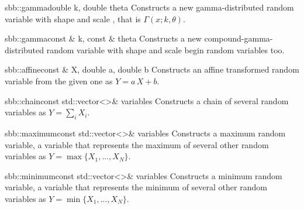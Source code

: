 \documentclass[a4paper, 10pt]{paper}
\begin{document}
\begin{deffunc}{sbb::gamma}{}{double k, double theta}
Constructs a new gamma-distributed random variable with shape  and 
scale  , that is $\Gamma(x; k, \theta)$.
\end{deffunc}

\begin{deffunc*}{sbb::gamma}{}{const \& k, const \& theta}
Constructs a new compound-gamma-distributed random variable with shape  and 
scale  begin random variables too.
\end{deffunc*}

\begin{deffunc}{sbb::affine}{}{const \& X, double a, double b}
Constructs an affine transformed random variable from the given one as $Y = a\,X+b$.
\end{deffunc}

\begin{deffunc}{sbb::chain}{}{const std::vector<>\& variables}
Constructs a chain of several random variables as $Y = \sum_i X_i$. 
\end{deffunc}

\begin{deffunc}{sbb::maximum}{}{const std::vector<>\& variables}
Constructs a maximum random variable, a variable that represents the maximum of several other random variables as $Y = \max\{X_1,...,X_N\}$.
\end{deffunc}

\begin{deffunc}{sbb::minimum}{}{const std::vector<>\& variables}
Constructs a minimum random variable, a variable that represents the minimum of several other random variables as $Y = \min\{X_1,...,X_N\}$.
\end{deffunc}
\end{document}
